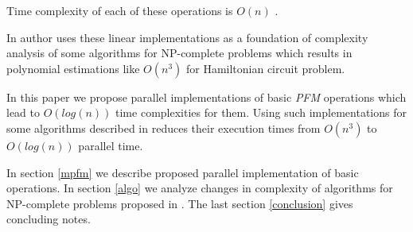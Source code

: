 


Time complexity of each of these operations is $O(n)$ \cite{Amos:1997, Katsanyi:2003}.

In \cite{Katsanyi:2003} author uses these linear implementations as a foundation of complexity analysis of some algorithms for NP-complete problems which results in polynomial estimations like $O(n^3)$ for Hamiltonian circuit problem.

In this paper we propose parallel implementations of basic \emph{PFM} operations which lead to $O(log(n))$ time complexities for them. Using such implementations for some algorithms described in \cite{Katsanyi:2003} reduces their execution times from $O(n^3)$ to $O(log(n))$ parallel time.

In section \ref{mpfm} we describe proposed parallel implementation of basic operations. In section \ref{algo} we analyze changes in complexity of algorithms for NP-complete problems proposed in \cite{Katsanyi:2003}. The last section \ref{conclusion} gives concluding notes.